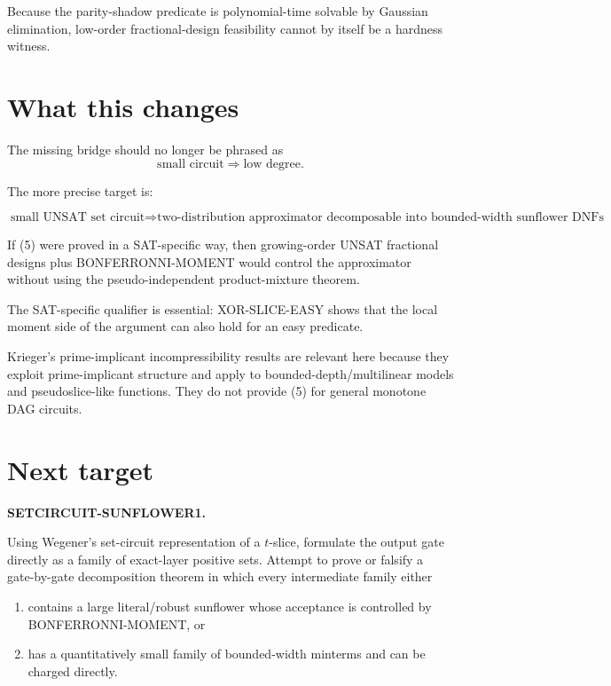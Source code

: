 \documentclass[11pt]{article}
\begin{document}
Because the parity-shadow predicate is polynomial-time solvable by Gaussian
elimination, low-order fractional-design feasibility cannot by itself be a
hardness witness.

\section{What this changes}

The missing bridge should no longer be phrased as
\[
\text{small circuit}\Rightarrow\text{low degree}.
\]

The more precise target is:

\[
\boxed{
\text{small UNSAT set circuit}
\Rightarrow
\text{two-distribution approximator decomposable into bounded-width
sunflower DNFs with small factorial tails}
}.
\tag{5}
\]

If (5) were proved in a SAT-specific way, then growing-order UNSAT fractional
designs plus BONFERRONNI-MOMENT would control the approximator without using
the pseudo-independent product-mixture theorem.

The SAT-specific qualifier is essential: XOR-SLICE-EASY shows that the local
moment side of the argument can also hold for an easy predicate.

Krieger's prime-implicant incompressibility results are relevant here because
they exploit prime-implicant structure and apply to bounded-depth/multilinear
models and pseudoslice-like functions.  They do not provide (5) for general
monotone DAG circuits.

\section{Next target}

\textbf{SETCIRCUIT-SUNFLOWER1.}

Using Wegener's set-circuit representation of a \(t\)-slice, formulate the
output gate directly as a family of exact-layer positive sets.  Attempt to
prove or falsify a gate-by-gate decomposition theorem in which every
intermediate family either

\begin{enumerate}
\item contains a large literal/robust sunflower whose acceptance is controlled
by BONFERRONNI-MOMENT, or
\item has a quantitatively small family of bounded-width minterms and can be
charged directly.
\end{enumerate}
\end{document}
